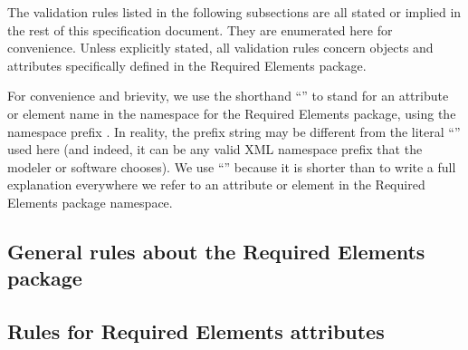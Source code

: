 The validation rules listed in the following subsections are all stated or implied in the rest of this specification document.  They are enumerated here for convenience.  Unless explicitly stated, all validation rules concern objects and attributes specifically defined in the Required Elements package.

For \notice convenience and brievity, we use the shorthand ``'' to stand for an attribute or element name  in the namespace for the Required Elements package, using the namespace prefix .  In reality, the prefix string may be different from the literal ``'' used here (and indeed, it can be any valid XML namespace prefix that the modeler or software chooses).  We use ``'' because it is shorter than to write a full explanation everywhere we refer to an attribute or element in the Required Elements package namespace.


\subsection*{General rules about the Required Elements package}

  



\subsection*{Rules for Required Elements attributes}

